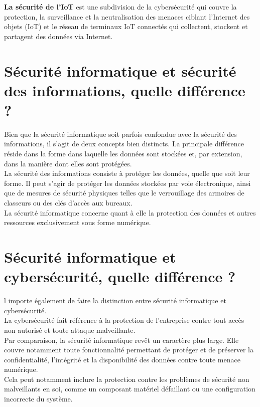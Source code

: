  \textbf{La sécurité de l’IoT} est une subdivision de la cybersécurité qui couvre la protection, la surveillance et la neutralisation des menaces ciblant l’Internet des objets (IoT) et le réseau de terminaux IoT connectés qui collectent, stockent et partagent des données via Internet.\\
 \section{Sécurité informatique et sécurité des informations, quelle différence ?}
 
 Bien que la sécurité informatique soit parfois confondue avec la sécurité des informations, il s’agit de deux concepts bien distincts. La principale différence réside dans la forme dans laquelle les données sont stockées et, par extension, dans la manière dont elles sont protégées.\\
 
 La sécurité des informations consiste à protéger les données, quelle que soit leur forme. Il peut s’agir de protéger les données stockées par voie électronique, ainsi que de mesures de sécurité physiques telles que le verrouillage des armoires de classeurs ou des clés d’accès aux bureaux.\\
 
 La sécurité informatique concerne quant à elle la protection des données et autres ressources exclusivement sous forme numérique.\\
 \section{Sécurité informatique et cybersécurité, quelle différence ?}
 l importe également de faire la distinction entre sécurité informatique et cybersécurité.\\
 
 La cybersécurité fait référence à la protection de l’entreprise contre tout accès non autorisé et toute attaque malveillante.\\
 
 Par comparaison, la sécurité informatique revêt un caractère plus large. Elle couvre notamment toute fonctionnalité permettant de protéger et de préserver la confidentialité, l’intégrité et la disponibilité des données contre toute menace numérique.\\ Cela peut notamment inclure la protection contre les problèmes de sécurité non malveillants en soi, comme un composant matériel défaillant ou une configuration incorrecte du système.\\
